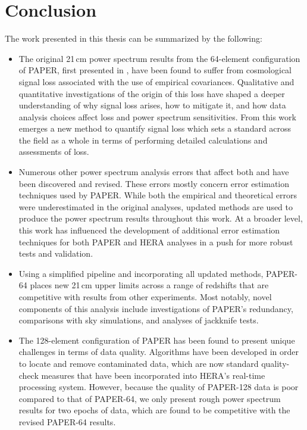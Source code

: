
\chapter{Conclusion}
\label{c.conclusion}

The work presented in this thesis can be summarized by the following:

\begin{itemize}
\item The original 21\,cm power spectrum results from the 64-element configuration of PAPER, first presented in , have been found to suffer from cosmological signal loss associated with the use of empirical covariances. Qualitative and quantitative investigations of the origin of this loss have shaped a deeper understanding of why signal loss arises, how to mitigate it, and how data analysis choices affect loss and power spectrum sensitivities. From this work emerges a new method to quantify signal loss which sets a standard across the field as a whole in terms of performing detailed calculations and assessments of loss.
\item Numerous other power spectrum analysis errors that affect both \citet{parsons_et_al2014} and  have been discovered and revised. These errors mostly concern error estimation techniques used by PAPER. While both the empirical and theoretical errors were underestimated in the original analyses, updated methods are used to produce the power spectrum results throughout this work. At a broader level, this work has influenced the development of additional error estimation techniques for both PAPER and HERA analyses in a push for more robust tests and validation.
\item Using a simplified pipeline and incorporating all updated methods, PAPER-64 places new 21\,cm upper limits across a range of redshifts that are competitive with results from other experiments. Most notably, novel components of this analysis include investigations of PAPER's redundancy, comparisons with sky simulations, and analyses of jackknife tests.
\item The 128-element configuration of PAPER has been found to present unique challenges in terms of data quality. Algorithms have been developed in order to locate and remove contaminated data, which are now standard quality-check measures that have been incorporated into HERA's real-time processing system. However, because the quality of PAPER-128 data is poor compared to that of PAPER-64, we only present rough power spectrum results for two epochs of data, which are found to be competitive with the revised PAPER-64 results.

\end{itemize}

